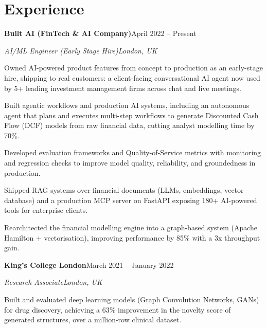 \documentclass[10pt,a4paper]{article}
\newcommand{\entry}[4]{%
  {\color{company}\bfseries #1}\hfill {\color{muted}#2}\par
  \vspace{1pt}
  {\itshape #3}\hfill {\color{muted}\itshape #4}\par
  \vspace{3pt}%
}
\begin{document}
\section{Experience}
\entry{Built AI (FinTech \& AI Company)}{April 2022 -- Present}{AI/ML Engineer (Early Stage Hire)}{London, UK}
\begin{tight}
  \item Owned AI-powered product features from concept to production as an early-stage hire, shipping to real customers: a client-facing conversational AI agent now used by 5+ leading investment management firms across chat and live meetings.
  \item Built agentic workflows and production AI systems, including an autonomous agent that plans and executes multi-step workflows to generate Discounted Cash Flow (DCF) models from raw financial data, cutting analyst modelling time by 70\%.
  \item Developed evaluation frameworks and Quality-of-Service metrics with monitoring and regression checks to improve model quality, reliability, and groundedness in production.
  \item Shipped RAG systems over financial documents (LLMs, embeddings, vector database) and a production MCP server on FastAPI exposing 180+ AI-powered tools for enterprise clients.
  \item Rearchitected the financial modelling engine into a graph-based system (Apache Hamilton + vectorisation), improving performance by 85\% with a 3x throughput gain.
\end{tight}

\entry{King's College London}{March 2021 -- January 2022}{Research Associate}{London, UK}
\begin{tight}
  \item Built and evaluated deep learning models (Graph Convolution Networks, GANs) for drug discovery, achieving a 63\% improvement in the novelty score of generated structures, over a million-row clinical dataset.
\end{tight}

\end{document}
